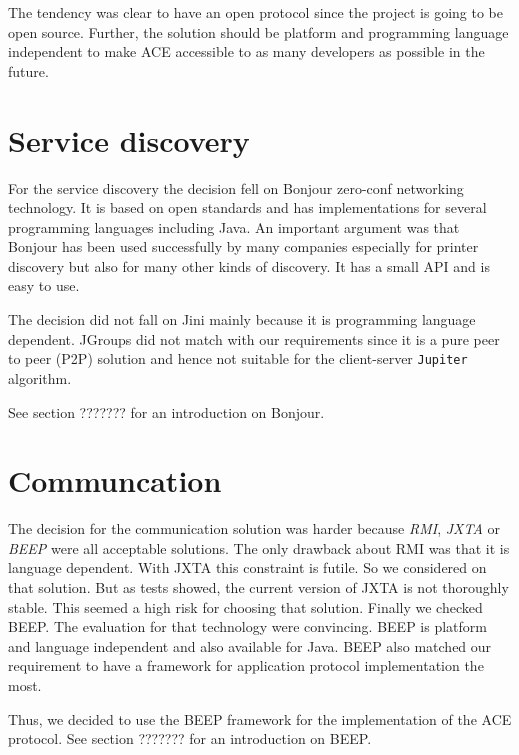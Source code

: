 The tendency was clear to have an open protocol since the project is going to be open source. Further, the solution should be platform and programming language independent to make ACE accessible to as many developers as possible in the future.

\section{Service discovery}
For the service discovery the decision fell on Bonjour zero-conf networking technology. It is based on open standards and has implementations for several programming languages including Java. An important argument was that Bonjour has been used successfully by many companies especially for printer discovery but also for many other kinds of discovery. It has a small API and is easy to use. 

The decision did not fall on Jini mainly because it is programming language dependent. JGroups did not match with our requirements since it is a pure peer to peer (P2P) solution and hence not suitable for the client-server \texttt{Jupiter} algorithm.

See section ??????? for an introduction on  Bonjour.

\section{Communcation}
The decision for the communication solution was harder because \emph{RMI}, \emph{JXTA} or \emph{BEEP} were all acceptable solutions. The only drawback about RMI was that it is language dependent. With JXTA this constraint is futile. So we considered on that solution. But as tests showed, the current version of JXTA is not thoroughly stable. This seemed a high risk for choosing that solution. Finally we checked BEEP. The evaluation for that technology were convincing. BEEP is platform and language independent and also available for Java. BEEP also matched our requirement to have a framework for application protocol implementation the most.

Thus, we decided to use the BEEP framework for the implementation of the ACE protocol. See section ??????? for an introduction on BEEP.

